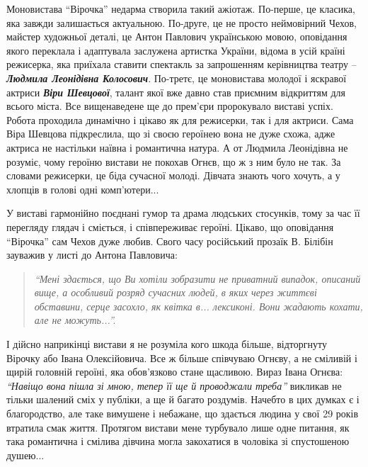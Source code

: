 
Моновистава \enquote{Вірочка} недарма створила такий ажіотаж. По-перше, це
класика, яка завжди залишається актуальною. По-друге, це не просто неймовірний
Чехов, майстер художньої деталі, це Антон Павлович українською мовою,
оповідання якого переклала і адаптувала заслужена артистка України, відома в
усій країні режисерка, яка приїхала ставити спектакль за запрошенням
керівництва театру – \emph{\textbf{Людмила Леонідівна Колосович}}. По-третє, це моновистава
молодої і яскравої актриси \emph{\textbf{Віри Шевцової}}, талант якої вже давно став приємним
відкриттям для всього міста. Все вищенаведене ще до прем'єри пророкувало
виставі успіх. Робота проходила динамічно і цікаво як для режисерки, так і для
актриси. Сама Віра Шевцова підкреслила, що зі своєю героїнею вона не дуже
схожа, адже актриса не настільки наївна і романтична натура. А от Людмила
Леонідівна не розуміє, чому героїню вистави не покохав Огнєв, що ж з ним було
не так. За словами режисерки, це біда сучасної молоді. Дівчата знають чого
хочуть, а у хлопців в голові одні комп'ютери...


У виставі гармонійно поєднані гумор та драма людських стосунків, тому за час її
перегляду глядач і сміється, і співпереживає героїні. Цікаво, що оповідання
\enquote{Вірочка} сам Чехов дуже любив. Свого часу російський прозаїк В. Білібін
зауважив у листі до Антона Павловича: 

\begin{quote}
\em\enquote{Мені здається, що Ви хотіли зобразити не
приватний випадок, описаний вище, а особливий розряд сучасних людей, в яких
через життєві обставини, серце засохло, як квітка в... лексиконі. Вони жадають
кохати, але не можуть...}. 
\end{quote}

І дійсно наприкінці вистави я не розуміла кого шкода
більше, відторгнуту Вірочку або Івана Олексійовича. Все ж більше співчуваю
Огнєву, а не сміливій і щирій головній героїні, яка обов'язково стане щасливою.
Вираз Івана Огнєва: \emph{\enquote{Навіщо вона пішла зі мною, тепер її ще й проводжали треба}}
викликав не тільки шалений сміх у публіки, а ще й багато роздумів. Начебто в
цих думках є і благородство, але таке вимушене і небажане, що здається людина у
свої 29 років втратила смак життя. Протягом вистави мене турбувало лише одне
питання, як така романтична і смілива дівчина могла закохатися в чоловіка зі
спустошеною душею... 

